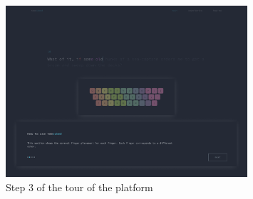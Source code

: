 \documentclass{report}
\begin{document}
\begin{figure}[H]
	\centering
	\includegraphics[width=0.8\textwidth]{frontend-guide-4.png}
	\caption{Step 3 of the tour of the platform}
	\centering
\end{figure}

\newpage
\printbibliography[heading=bibintoc,title={References}]{}
\end{document}
